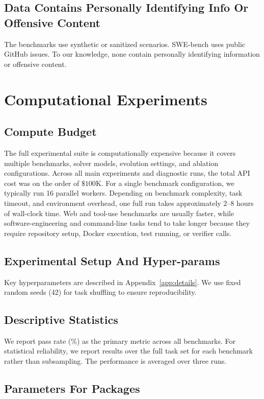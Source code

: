 \subsection{Data Contains Personally Identifying Info Or Offensive Content}
The benchmarks use synthetic or sanitized scenarios. SWE-bench uses public GitHub issues. To our knowledge, none contain personally identifying information or offensive content.

\section{Computational Experiments}\label{sec:app-compute}

\subsection{Compute Budget}
The full experimental suite is computationally expensive because it covers multiple benchmarks, solver models, evolution settings, and ablation configurations. Across all main experiments and diagnostic runs, the total API cost was on the order of \(\$100\mathrm{K}\). For a single benchmark configuration, we typically run 16 parallel workers. Depending on benchmark complexity, task timeout, and environment overhead, one full run takes approximately 2--8 hours of wall-clock time. Web and tool-use benchmarks are usually faster, while software-engineering and command-line tasks tend to take longer because they require repository setup, Docker execution, test running, or verifier calls.

\subsection{Experimental Setup And Hyper-params}
Key hyperparameters are described in Appendix~\ref{app:details}. We use fixed random seeds (42) for task shuffling to ensure reproducibility.

\subsection{Descriptive Statistics}
We report pass rate (\%) as the primary metric across all benchmarks. For statistical reliability, we report results over the full task set for each benchmark rather than subsampling. The performance is averaged over three runs.

\subsection{Parameters For Packages}

